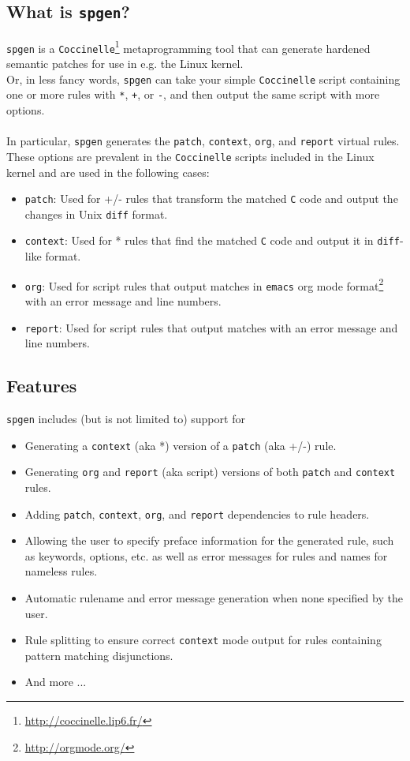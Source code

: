 \subsection{What is \texttt{spgen}?}
\texttt{spgen} is a \texttt{Coccinelle}\footnote{\hyperref[http://coccinelle.lip6.fr/]{http://coccinelle.lip6.fr/}} metaprogramming tool that can generate hardened semantic patches for use in e.g. the Linux kernel.\\
Or, in less fancy words, \texttt{spgen} can take your simple \texttt{Coccinelle} script containing one or more rules with \texttt{*}, \texttt{+}, or \texttt{-}, and then output the same script with more options.\\\\
In particular, \texttt{spgen} generates the \texttt{patch}, \texttt{context}, \texttt{org}, and \texttt{report} virtual rules. These options are prevalent in the \texttt{Coccinelle} scripts included in the Linux kernel and are used in the following cases:
\begin{itemize}
\item \texttt{patch}: Used for +/- rules that transform the matched \texttt{C} code and output the changes in Unix \texttt{diff} format.
\item \texttt{context}: Used for * rules that find the matched \texttt{C} code and output it in \texttt{diff}-like format.
\item \texttt{org}: Used for script rules that output matches in
  \texttt{emacs} org mode
  format\footnote{\hyperref[http://orgmode.org/]{http://orgmode.org/}} with
  an error message and line numbers.
\item \texttt{report}: Used for script rules that output matches with an error message and line numbers.
\end{itemize}
\bigskip

\subsection{Features}
\texttt{spgen} includes (but is not limited to) support for
\begin{itemize}
\item Generating a \texttt{context} (aka *) version of a \texttt{patch} (aka +/-) rule.
\item Generating \texttt{org} and \texttt{report} (aka script) versions of both \texttt{patch} and \texttt{context} rules.
\item Adding \texttt{patch}, \texttt{context}, \texttt{org}, and \texttt{report} dependencies to rule headers.
\item Allowing the user to specify preface information for the generated rule, such as keywords, options, etc. as well as error messages for rules and names for nameless rules.
\item Automatic rulename and error message generation when none specified by the user.
\item Rule splitting to ensure correct \texttt{context} mode output for rules containing pattern matching disjunctions.
\item And more ...
\end{itemize}
